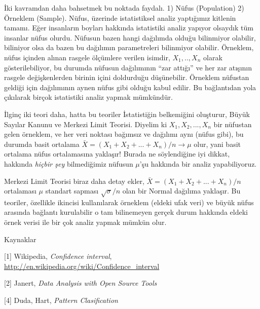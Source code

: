 \documentclass[12pt,fleqn]{article}\usepackage{../../common}
\begin{document}
İki kavramdan daha bahsetmek bu noktada faydalı. 1) Nüfus (Population) 2)
Örneklem (Sample). Nüfus, üzerinde istatistiksel analiz yaptığımız kitlenin
tamamı. Eğer insanların boyları hakkında istatistiki analiz yapıyor
olsaydık tüm insanlar nüfus olurdu. Nüfusun bazen hangi dağılımda olduğu
bilinmiyor olabilir, biliniyor olsa da bazen bu dağılımın parametreleri
bilinmiyor olabilir. Örneklem, nüfus içinden alınan rasgele ölçümlere
verilen isimdir, $X_1,..,X_n$ olarak gösterilebiliyor, bu durumda nüfusun
dağılımının ``zar attığı'' ve her zar atışının rasgele değişkenlerden
birinin içini doldurduğu düşünebilir. Örneklem nüfustan geldiği için
dağılımının aynen nüfus gibi olduğu kabul edilir. Bu bağlantıdan yola
çıkılarak birçok istatistiki analiz yapmak mümkündür.

İlginç iki teori daha, hatta bu teoriler İstatistiğin belkemiğini oluşturur,
Büyük Sayılar Kanunu ve Merkezi Limit Teorisi. Diyelim ki $X_1,X_2,...,X_n$ bir
nüfustan gelen örneklem, ve her veri noktası bağımsız ve dağılımı aynı (nüfus
gibi), bu durumda basit ortalama $\bar{X} = (X_1+X_2+...+X_n) / n \to \mu$ olur,
yani basit ortalama nüfus ortalamasına yaklaşır! Burada ne söylendiğine iyi
dikkat, hakkında {\em hiçbir şey} bilmediğimiz nüfusun $\mu$'şu hakkında
bir analiz yapabiliyoruz. 

Merkezi Limit Teorisi biraz daha detay ekler, $\bar{X} = (X_1+X_2+...+X_n)
/ n$ ortalaması $\mu$ standart sapması $\sqrt{\sigma} / n$ olan bir Normal
dağılıma yaklaşır. Bu teoriler, özellikle ikincisi kullanılarak örneklem
(eldeki ufak veri) ve büyük nüfus arasında bağlantı kurulabilir o tam
bilinemeyen gerçek durum hakkında eldeki örnek verisi ile bir çok analiz
yapmak mümkün olur.

Kaynaklar

[1] Wikipedia, {\em Confidence interval}, \url{http://en.wikipedia.org/wiki/Confidence_interval}

[2] Janert, {\em Data Analysis with Open Source Tools}

[4] Duda, Hart, {\em Pattern Clasification}
\end{document}
